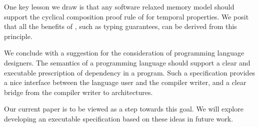 One key lesson we draw is that any software relaxed memory model should
support the cyclical composition proof rule of
\citet{Abadi:1993:CS:151646.151649} for temporal properties.  We posit that all
the benefits of \oota, such as typing guarantees, can be derived from this
principle. 

We conclude with a suggestion for the consideration of programming language
designers.  The semantics of a programming language should support a clear
and executable prescription of dependency in a program.  Such a specification
provides a nice interface between the language user and the compiler writer,
and a clear bridge from the compiler writer to architectures.

Our current paper is to be viewed as a step towards this goal.  We will
explore developing an executable specification based on these ideas in future
work.
 


\endinput
\section{SCRAPS}


